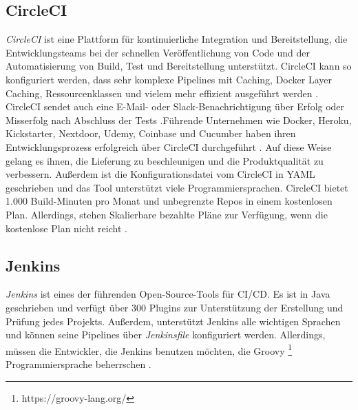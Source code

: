 \subsection{CircleCI}

\textit{CircleCI} ist eine Plattform für kontinuierliche Integration und Bereitstellung, die Entwicklungsteams bei der schnellen Veröffentlichung von Code und der Automatisierung von Build, Test und Bereitstellung unterstützt. CircleCI kann so konfiguriert werden, dass sehr komplexe Pipelines mit Caching, Docker Layer Caching, Ressourcenklassen und vielem mehr effizient ausgeführt werden \cite{CircleCI:homepage}.
CircleCI sendet auch eine E-Mail- oder Slack-Benachrichtigung über Erfolg oder Misserfolg nach Abschluss der Tests \cite{CircleCI:notifications}.Führende Unternehmen wie Docker, Heroku, Kickstarter, Nextdoor, Udemy, Coinbase und Cucumber haben ihren Entwicklungsprozess erfolgreich über CircleCI durchgeführt \cite{CircleCI:customers}. Auf diese Weise gelang es ihnen, die Lieferung zu beschleunigen und die Produktqualität zu verbessern. Außerdem ist die Konfigurationsdatei vom CircleCI in YAML geschrieben und das Tool unterstützt viele Programmiersprachen. CircleCI bietet 1.000 Build-Minuten pro Monat und unbegrenzte Repos in einem kostenlosen Plan. Allerdings, stehen Skalierbare bezahlte Pläne zur Verfügung, wenn die kostenlose Plan nicht reicht \cite{CircleCI:pricing}.

\subsection{Jenkins}

\textit{Jenkins} ist eines der führenden Open-Source-Tools für \ac{CI/CD}. Es ist in Java geschrieben und verfügt über 300 Plugins zur Unterstützung der Erstellung und Prüfung jedes Projekts. Außerdem, unterstützt Jenkins alle wichtigen Sprachen und können seine Pipelines über \textit{Jenkinsfile} konfiguriert werden. Allerdings, müssen die Entwickler, die Jenkins benutzen möchten, die Groovy \footnote{https://groovy-lang.org/} Programmiersprache beherrschen \cite{Jenkins:pipeline}.

